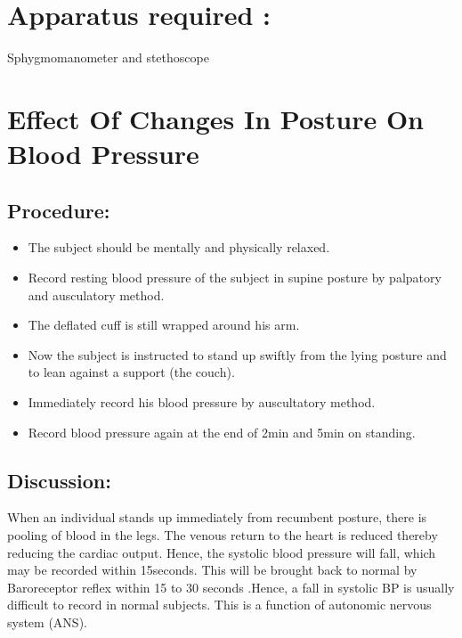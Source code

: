 \documentclass[a4paper,12pt]{book}
\begin{document}
	\section*{Apparatus required :}
	Sphygmomanometer and stethoscope
	\section*{Effect Of Changes In Posture On Blood Pressure}
	\subsection*{Procedure:}
	\begin{itemize}
\item{The subject should be mentally and physically relaxed.}
\item{Record resting blood pressure of the subject in supine posture by palpatory and ausculatory method.}
\item{The deflated cuff is still wrapped around his arm.}
\item{Now the subject is instructed to stand up swiftly from the lying posture and to lean against a support (the couch).}
\item{Immediately record his blood pressure by auscultatory method.}
\item{Record blood pressure again at the end of 2min and 5min on standing.}
	\end{itemize}
	\subsection*{Discussion:}
		When an individual stands up immediately from recumbent posture, there is pooling of blood in the legs.
		The venous return to the heart is reduced thereby reducing the cardiac output. Hence, the systolic blood pressure will fall, which may be recorded within 15seconds. This will be brought back to normal by Baroreceptor reflex within 15 to 30 seconds .Hence, a fall in systolic BP is usually difficult to record in normal subjects.
		This is a function of autonomic nervous system (ANS).
\end{document}
